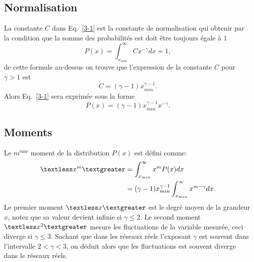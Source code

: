 \subsection{Normalisation}

La constante $C$ dans Eq.~\eqref{3-1} est la constante de normalisation qui obtenir par la condition que la somme des probabilités est doit être toujours égale à $1$
\begin{equation}
P(x)=\int_{x_{min}}^{\infty}Cx^{-\gamma}dx=1,
\label{3-2}
\end{equation}
de cette formule au-dessus on trouve que l'expression de la constante $C$ pour $\gamma>1$ est
\begin{equation}
C=(\gamma-1)x_{min}^{\gamma-1}.
\end{equation}
Alors Eq.~\eqref{3-1} sera exprimée sous la forme
\begin{equation}
P(x)=(\gamma-1)x_{min}^{\gamma-1}x^{-\gamma}.
\label{3-4}
\end{equation}
\subsection{Moments}
Le $m^{\text{ème}}$ moment de la distribution $P(x)$ est défini comme:
\begin{align}
\textless x^m\textgreater&=\int_{x_{min}}^{\infty} x^mP(x)dx\nonumber\\
&=(\gamma-1)x_{min}^{\gamma-1}\int_{x_{min}}^{\infty}x^{m-\gamma}dx.
\end{align}
Le premier moment $\textless x\textgreater$  est le degré moyen de la grandeur $x$, notez que sa valeur devient infinie si $\gamma\leq2$. Le second moment $\textless x^2\textgreater$ mesure les fluctuations de la variable mesurée, ceci diverge si $\gamma\leq3$. Sachant que dans les réseaux réels l'exposant $\gamma$ est souvent  dans l'intervalle $2<\gamma<3$, on déduit alors que les fluctuations est souvent diverge dans le réseaux réels.\\


